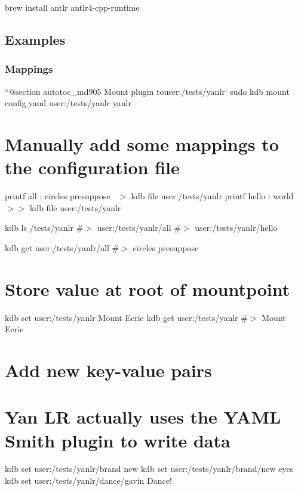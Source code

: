 \begin{DoxyCode}
brew install antlr antlr4-cpp-runtime
\end{DoxyCode}
\hypertarget{autotoc_md897_autotoc_md903}{}\subsection{Examples}\label{autotoc_md897_autotoc_md903}
\hypertarget{autotoc_md897_autotoc_md904}{}\subsubsection{Mappings}\label{autotoc_md897_autotoc_md904}
``{\ttfamily  @section autotoc\+\_\+md905 Mount plugin to}user\+:/tests/yanlr` sudo kdb mount config.\+yaml user\+:/tests/yanlr yanlr\hypertarget{autotoc_md897_autotoc_md906}{}\section{Manually add some mappings to the configuration file}\label{autotoc_md897_autotoc_md906}
printf \textquotesingle{}all \+: circles presuppose~\newline
\textquotesingle{} $>$ {\ttfamily kdb file user\+:/tests/yanlr} printf \textquotesingle{}hello \+: world~\newline
\textquotesingle{} $>$$>$ {\ttfamily kdb file user\+:/tests/yanlr}

kdb ls /tests/yanlr \#$>$ user\+:/tests/yanlr/all \#$>$ user\+:/tests/yanlr/hello

kdb get user\+:/tests/yanlr/all \#$>$ circles presuppose\hypertarget{autotoc_md897_autotoc_md907}{}\section{Store value at root of mountpoint}\label{autotoc_md897_autotoc_md907}
kdb set user\+:/tests/yanlr \textquotesingle{}Mount Eerie\textquotesingle{} kdb get user\+:/tests/yanlr \#$>$ Mount Eerie\hypertarget{autotoc_md897_autotoc_md908}{}\section{Add new key-\/value pairs}\label{autotoc_md897_autotoc_md908}
\hypertarget{autotoc_md897_autotoc_md909}{}\section{Yan L\+R actually uses the Y\+A\+M\+L Smith plugin to write data}\label{autotoc_md897_autotoc_md909}
kdb set user\+:/tests/yanlr/brand new kdb set user\+:/tests/yanlr/brand/new eyes kdb set user\+:/tests/yanlr/dance/gavin \textquotesingle{}Dance!\textquotesingle{}

